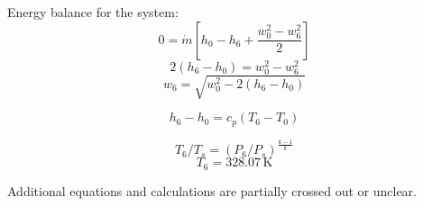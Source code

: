 Energy balance for the system:  
\[ 0 = \dot{m} \left[ h_0 - h_6 + \frac{w_0^2 - w_6^2}{2} \right] \]  
\[ 2 \left( h_6 - h_0 \right) = w_0^2 - w_6^2 \]  
\[ w_6 = \sqrt{w_0^2 - 2 \left( h_6 - h_0 \right)} \]  

\[ h_6 - h_0 = c_p \left( T_6 - T_0 \right) \]  

\[ T_6 / T_s = \left( P_6 / P_s \right)^{\frac{k-1}{k}} \]  
\[ T_6 = 328.07 \, \text{K} \]  

Additional equations and calculations are partially crossed out or unclear.